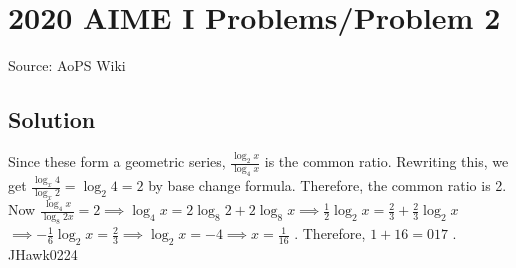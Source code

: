 \documentclass[12pt]{article}
\begin{document}
\section*{{2020 AIME I Problems/Problem 2}}
Source: AoPS Wiki

\subsection*{Solution}
Since these form a geometric series, $\frac{\log_2{x}}{\log_4{x}}$ is the common ratio. Rewriting this, we get $\frac{\log_x{4}}{\log_x{2}} = \log_2{4} = 2$ by base change formula. Therefore, the common ratio is 2. Now $\frac{\log_4{x}}{\log_8{2x}} = 2 \implies \log_4{x} = 2\log_8{2} + 2\log_8{x} \implies \frac{1}{2}\log_2{x} = \frac{2}{3} + \frac{2}{3}\log_2{x}$ $\implies -\frac{1}{6}\log_2{x} = \frac{2}{3} \implies \log_2{x} = -4 \implies x = \frac{1}{16}$ . Therefore, $1 + 16 = \boxed{017}$ . ~ JHawk0224
\end{document}
